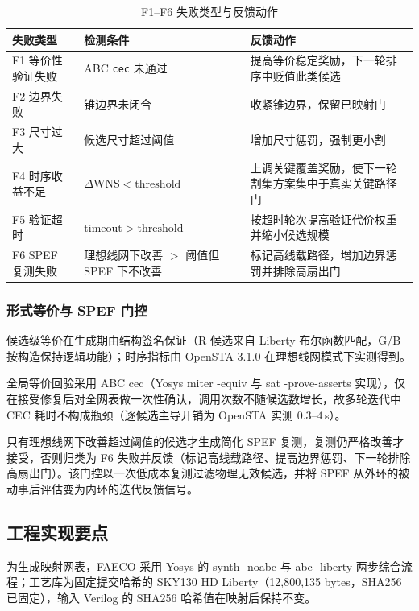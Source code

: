 \documentclass[journal]{IEEEtran}
\begin{document}
\begin{table}[!t]
\centering
\caption{F1--F6 失败类型与反馈动作}
\label{tab:failures}
\scriptsize
\setlength{\tabcolsep}{2pt}
\begin{tabular}{p{2.0cm}p{3.2cm}p{2.9cm}}
\toprule
\textbf{失败类型} & \textbf{检测条件} & \textbf{反馈动作} \\
\midrule
F1 等价性验证失败 & ABC \texttt{cec} 未通过 & 提高等价稳定奖励，下一轮排序中贬值此类候选 \\
F2 边界失败 & 锥边界未闭合 & 收紧锥边界，保留已映射门 \\
F3 尺寸过大 & 候选尺寸超过阈值 & 增加尺寸惩罚，强制更小割 \\
F4 时序收益不足 & $\Delta\mathrm{WNS} < \mathrm{threshold}$ & 上调关键覆盖奖励，使下一轮割集方案集中于真实关键路径门 \\
F5 验证超时 & $\mathrm{timeout} > \mathrm{threshold}$ & 按超时轮次提高验证代价权重并缩小候选规模 \\
F6 SPEF 复测失败 & 理想线网下改善 $>$ 阈值但 SPEF 下不改善 & 标记高线载路径，增加边界惩罚并排除高扇出门 \\
\bottomrule
\end{tabular}
\end{table}

\subsubsection{形式等价与 SPEF 门控}
候选级等价在生成期由结构签名保证（R 候选来自 Liberty 布尔函数匹配，G/B 按构造保持逻辑功能）；时序指标由 OpenSTA 3.1.0 在理想线网模式下实测得到。

全局等价回验采用 ABC cec（Yosys miter -equiv 与 sat -prove-asserts 实现），仅在接受修复后对全网表做一次性确认，调用次数不随候选数增长，故多轮迭代中 CEC 耗时不构成瓶颈（逐候选主导开销为 OpenSTA 实测 $0.3$--$4\,$s）。

只有理想线网下改善超过阈值的候选才生成简化 SPEF 复测，复测仍严格改善才接受，否则归类为 F6 失败并反馈（标记高线载路径、提高边界惩罚、下一轮排除高扇出门）。该门控以一次低成本复测过滤物理无效候选，并将 SPEF 从外环的被动事后评估变为内环的迭代反馈信号。

\subsection{工程实现要点}\label{sec:impl}

为生成映射网表，FAECO 采用 Yosys 的 synth -noabc 与 abc -liberty 两步综合流程；工艺库为固定提交哈希的 SKY130 HD Liberty（12,800,135 bytes，SHA256 已固定），输入 Verilog 的 SHA256 哈希值在映射后保持不变。
\end{document}
